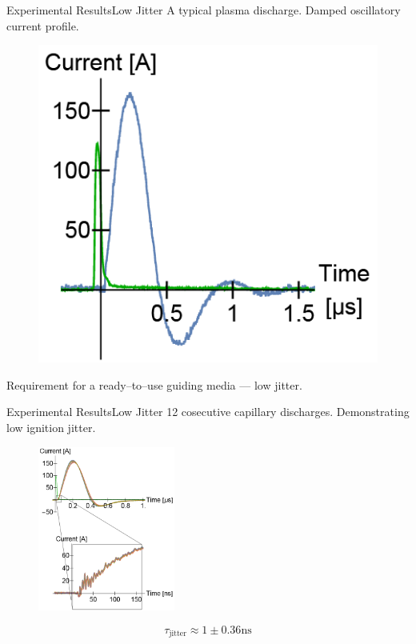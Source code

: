 \documentclass[]{beamer}
\begin{document}
  \begin{frame}{Experimental Results}{Low Jitter}
    A typical plasma discharge. Damped oscillatory current profile.
    \begin{figure}
      \includegraphics[]{figures/results/typical.png}
    \end{figure}
    Requirement for a ready--to--use guiding media --- low jitter.
  \end{frame}
  \begin{frame}{Experimental Results}{Low Jitter}
    12 cosecutive capillary discharges. Demonstrating low ignition jitter.
    \begin{figure}
      \includegraphics[width=0.4\textwidth]{figures/results/low_jitter.png}
    \end{figure}
    $$\tau_\text{jitter}\approx 1\pm 0.36 \si{\ns}$$
  \end{frame}
\end{document}
